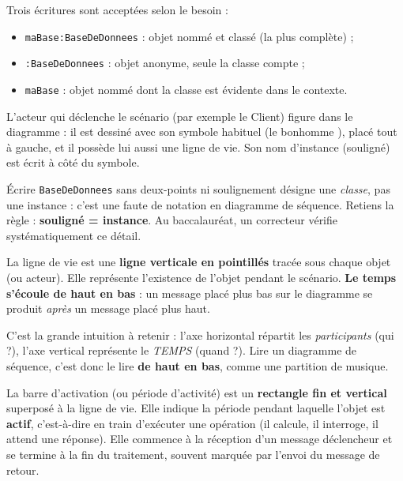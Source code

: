\documentclass[11pt]{article}
\newcommand{\cle}[1]{{\popxbold\color{popdark}#1}}
\newcounter{popsec}
\newcounter{popsub}
\newcommand{\courssub}[1]{%
  \stepcounter{popsub}%
  \par\vspace{9pt}\noindent{\popxbold\fontsize{11.5}{13}\selectfont\color{popink}{\color{poporange}\thepopsec.\thepopsub}\hspace{6pt}#1}\par\nopagebreak\vspace{4pt}
}
\begin{document}
Trois écritures sont acceptées selon le besoin :
\begin{itemize}
\item \texttt{maBase:BaseDeDonnees} : objet nommé et classé (la plus complète) ;
\item \texttt{:BaseDeDonnees} : objet anonyme, seule la classe compte ;
\item \texttt{maBase} : objet nommé dont la classe est évidente dans le contexte.
\end{itemize}

L'\cle{acteur} qui déclenche le scénario (par exemple le Client) figure dans le diagramme : il est dessiné avec son symbole habituel (le \og bonhomme \fg{}), placé tout à gauche, et il possède lui aussi une ligne de vie. Son nom d'instance (souligné) est écrit à côté du symbole.

\begin{attention}
Écrire \texttt{BaseDeDonnees} sans deux-points ni soulignement désigne une \emph{classe}, pas une instance : c'est une faute de notation en diagramme de séquence. Retiens la règle : \textbf{souligné = instance}. Au baccalauréat, un correcteur vérifie systématiquement ce détail.
\end{attention}

\courssub{La ligne de vie et l'axe du temps}

\begin{definition}
La \cle{ligne de vie} est une \textbf{ligne verticale en pointillés} tracée sous chaque objet (ou acteur). Elle représente l'existence de l'objet pendant le scénario. \textbf{Le temps s'écoule de haut en bas} : un message placé plus bas sur le diagramme se produit \emph{après} un message placé plus haut.
\end{definition}

C'est la grande intuition à retenir : l'axe horizontal répartit les \emph{participants} (qui ?), l'axe vertical représente le \emph{TEMPS} (quand ?). Lire un diagramme de séquence, c'est donc le lire \textbf{de haut en bas}, comme une partition de musique.

\begin{definition}
La \cle{barre d'activation} (ou période d'activité) est un \textbf{rectangle fin et vertical} superposé à la ligne de vie. Elle indique la période pendant laquelle l'objet est \textbf{actif}, c'est-à-dire en train d'exécuter une opération (il calcule, il interroge, il attend une réponse). Elle commence à la réception d'un message déclencheur et se termine à la fin du traitement, souvent marquée par l'envoi du message de retour.
\end{definition}
\end{document}
